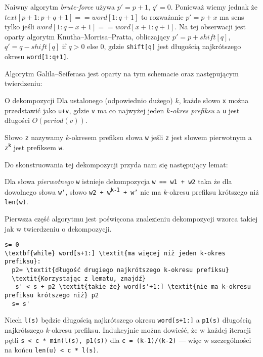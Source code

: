 Naiwny algorytm \textit{brute-force} używa $p'= p+1$, $q'= 0$. Ponieważ wiemy jednak że $text[p+1:p+q+1] == word[1:q+1]$ to rozważanie $p'= p+x$ ma sens tylko jeśli $word[1:q-x+1] == word[x+1:q+1]$. Na tej obserwacji jest oparty algorytm Knutha–Morrisa–Pratta, obliczający $p'= p+shift[q]$, $q'= q-shift[q]$ if $q>0$ else $0$, gdzie \texttt{shift[q]} jest długością najkrótszego okresu \texttt{word[1:q+1]}.

Algorytm Galila–Seiferasa jest oparty na tym schemacie oraz następującym twierdzeniu:
\begin{theorem}{}{O dekompozycji}
Dla ustalonego (odpowiednio dużego) \(k\), każde słowo \texttt{x} można przedstawić jako \texttt{u+v}, gdzie \texttt{v} ma co najwyżej jeden \textit{\(k\)-okres prefiksu} a \texttt{u} jest długości $O(period(v))$. 
\end{theorem}
Słowo \texttt{z} nazywamy \(k\)-okresem prefiksu słowa \texttt{w} jeśli \texttt{z} jest słowem pierwotnym a \texttt{z\textsuperscript{k}} jest prefiksem \texttt{w}.

Do skonstruowania tej dekompozycji przyda nam się następujący lemat:
\begin{lemma}{}{}
Dla słowa \textit{pierwotnego} \texttt{w} istnieje dekompozycja \texttt{w == w1 + w2} taka że dla dowolnego słowa \texttt{w'}, słowo \texttt{w2 + w\textsuperscript{k-1} + w'} nie ma \(k\)-okresu prefiksu krótszego niż \texttt{len(w)}.
\end{lemma}

Pierwsza część algorytmu jest poświęcona znalezieniu dekompozycji wzorca takiej jak w twierdzeniu o dekompozycji.
\begin{verbatim}
s= 0
\textbf{while} word[s+1:] \textit{ma więcej niż jeden k-okres prefiksu}:
  p2= \textit{długość drugiego najkrótszego k-okresu prefiksu}
  \textit{Korzystając z lematu, znajdź}
   s' < s + p2 \textit{takie że} word[s'+1:] \textit{nie ma k-okresu prefiksu krótszego niż} p2
  s= s'
\end{verbatim}
Niech \texttt{l(s)} będzie długością najkrótszego okresu \texttt{word[s+1:]} a \texttt{p1(s)} długością najkrótszego \(k\)-okresu prefiksu. Indukcyjnie można dowieść, że w każdej iteracji pętli \texttt{s < c * min(l(s), p1(s))} dla \texttt{c = (k-1)/(k-2)} — więc w szczególności na końcu \texttt{len(u) < c * l(s)}.

